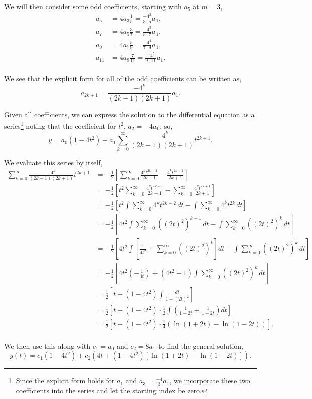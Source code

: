 \documentclass[../hw8]{subfiles}
\begin{document}
We will then consider some odd coefficients, starting with $a_5$ at $m=3$,
\begin{align*}
    a_5&=4a_3\frac{1}{5}=\frac{-4^2}{3\cdot5}a_1,\\
    a_7&=4a_5\frac{3}{7}=\frac{-4^3}{5\cdot7}a_1,\\
    a_9&=4a_7\frac{5}{9}=\frac{-4^4}{7\cdot9}a_1,\\
    a_{11}&=4a_9\frac{7}{11}=\frac{-4^5}{9\cdot11}a_1.\\
\end{align*}

We see that the explicit form for all of the odd coefficients can be written as,
\[a_{2k+1}=\frac{-4^k}{(2k-1)(2k+1)}a_1.\]

Given all coefficients, we can express the solution to the differential equation as a series\footnote{Since the explicit form holds for $a_1$ and $a_3=\frac{-4}{3}a_1$, we incorporate these two coefficients into the series and let the starting index be zero.} noting that the coefficient for $t^2$, $a_2=-4a_0$; so,
\[y=a_0(1-4t^2)+a_1\sum\limits_{k=0}^{\infty}\frac{-4^k}{(2k-1)(2k+1)}t^{2k+1}.\]

We evaluate this series by itself,
\begin{align*}
    \sum\limits_{k=0}^{\infty}\frac{-4^k}{(2k-1)(2k+1)}t^{2k+1}&=-\frac{1}{2}\left[ \sum\limits_{k=0}^{\infty} \frac{4^k t^{2k+1}}{2k-1}-\frac{4^k t^{2k+1}}{2k+1}\right]\\
    &=-\frac{1}{2}\left[ t^2 \sum\limits_{k=0}^{\infty}\frac{4^k t^{2k-1}}{2k-1} - \sum\limits_{k=0}^{\infty}\frac{4^k t^{2k+1}}{2k+1} \right]\\
    &=-\frac{1}{2}\left[ t^2 \int \sum\limits_{k=0}^{\infty}4^k t^{2k-2}\,dt - \int \sum\limits_{k=0}^{\infty}4^k t^{2k}\,dt \right]\\
    &=-\frac{1}{2}\left[ 4t^2 \int \sum\limits_{k=0}^{\infty}{\left( {(2t)}^2 \right)}^{k-1}\,dt - \int \sum\limits_{k=0}^{\infty}{\left( {(2t)}^2 \right)}^k\,dt\right] \\
    &=-\frac{1}{2}\left[ 4t^2 \int \left[ \frac{1}{4t^2} + \sum\limits_{k=0}^{\infty}{\left( {(2t)}^2 \right)}^k\right]dt - \int \sum\limits_{k=0}^{\infty}{\left( {(2t)}^2 \right)}^k\,dt\right] \\
    &=-\frac{1}{2}\left[ 4t^2\left( -\frac{1}{4t} \right) + \left( 4t^2-1 \right)\int \sum\limits_{k=0}^{\infty}{\left( {(2t)}^2 \right)}^k\,dt \right]\\
    &=\frac{1}{2}\left[ t + \left( 1-4t^2 \right)\int \frac{dt}{1-{(2t)}^2} \right] \\
    &=\frac{1}{2}\left[ t+\left( 1-4t^2 \right)\cdot\frac{1}{2}\int \left( \frac{1}{1+2t}+\frac{1}{1-2t} \right)dt \right]\\
    &=\frac{1}{2}
    \left[ t+\left( 1-4t^2 \right)\cdot\frac{1}{4}\left( \ln{(1+2t)}-\ln{(1-2t)} \right) \right].\\
\end{align*}

We then use this along with $c_1=a_0$ and $c_2=8a_1$ to find the general solution,
\[y(t)=c_1\left( 1-4t^2 \right)+c_2\left( 4t+\left( 1-4t^2 \right)\left[ \ln{(1+2t)}-\ln{(1-2t)} \right] \right).\]
\end{document}
